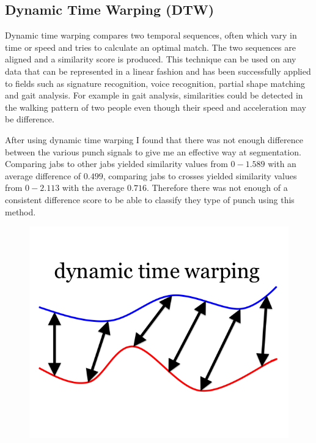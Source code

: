\subsection{Dynamic Time Warping (DTW)}
Dynamic time warping compares two temporal sequences, often which vary in time or speed and tries to calculate an optimal match. The two sequences are aligned and a similarity score is produced. This technique can be used on any data that can be represented in a linear fashion and has been successfully applied to fields such as signature recognition, voice recognition, partial shape matching and gait analysis. For example in gait analysis, similarities could be detected in the walking pattern of two people even though their speed and acceleration may be difference. 

After using dynamic time warping I found that there was not enough difference between the various punch signals to give me an effective way at segmentation. Comparing jabs to other jabs yielded similarity values from $0 - 1.589$ with an average difference of $0.499$, comparing jabs to crosses yielded similarity values from $0-2.113$ with the average $0.716$. Therefore there was not enough of a consistent difference score to be able to classify they type of punch using this method.


\begin{figure}[h]
    \centering
    \includegraphics[height=0.25\textheight]{fig03/dtw}
    \label{fig:kinect}
\end{figure}


